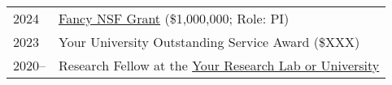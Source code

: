 
\begin{longtable}[l]{@{}p{} p{}}
    2024 & \href{https://www.nsf.gov/}{Fancy NSF Grant} (\$1,000,000; Role: PI) \\
   
    2023 & Your University Outstanding Service Award (\$XXX) \\
       
    2020-- & Research Fellow at the \href{https://example.com/}{Your Research Lab or University} \\

   
\end{longtable}


